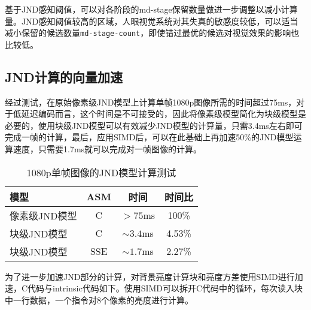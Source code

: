   基于JND感知阈值，可以对各阶段的md-stage保留数量做进一步调整以减小计算量。JND感知阈值较高的区域，人眼视觉系统对其失真的敏感度较低，可以适当减小保留的候选数量\texttt{md-stage-count}，即使错过最优的候选对视觉效果的影响也比较低。


  \subsection{JND计算的向量加速}

  经过测试，在原始像素级JND模型上计算单帧1080p图像所需的时间超过75ms，对于低延迟编码而言，这个时间是不可接受的，因此将像素级模型简化为块级模型是必要的，使用块级JND模型可以有效减少JND模型的计算量，只需3.4ms左右即可完成一帧的计算，最后，应用SIMD后，可以在此基础上再加速50\%的JND模型运算速度，只需要1.7ms就可以完成对一帧图像的计算。

  \begin{table}[!hpt]
    \renewcommand{\arraystretch}{0.9}
    \caption{1080p单帧图像的JND模型计算测试}
    \label{tab:jnd-compute}
    \centering
    \begin{tabular}{lccc} \toprule
      模型 & ASM & 时间 &时间比  \\ \midrule
      像素级JND模型 & C   & $>75$ms & 100\% \\
      块级JND模型   & C & $\sim 3.4$ms & 4.53\% \\
      块级JND模型   & SSE & $\sim 1.7$ms & 2.27\%\\ \bottomrule
    \end{tabular}
  \end{table}

  为了进一步加速JND部分的计算，对背景亮度计算块和亮度方差使用SIMD进行加速，C代码与intrinsic代码如下。使用SIMD可以拆开C代码中的循环，每次读入块中一行数据，一个指令对8个像素的亮度进行计算。

